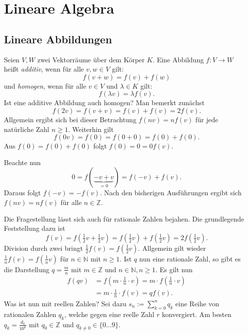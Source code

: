 \documentclass[a4paper,10pt,fleqn,twocolumn,twoside,dvipdfmx]{scrartcl}
\numberwithin{equation}{section}
\newcommand{\N}{\mathbb N}
\newcommand{\Z}{\mathbb Z}
\theoremstyle{rmbox}
\begin{document}
\section{Lineare Algebra}
\subsection{Lineare Abbildungen}
Seien $V,W$ zwei Vektorräume über dem Körper $K$. Eine Abbildung
$f\colon V\to W$ heißt \emph{additiv}, wenn für alle $v,w\in V$ gilt:%
\begin{equation}
f(v+w) = f(v)+f(w)
\end{equation}
und \emph{homogen}, wenn für alle $v\in V$ und $\lambda\in K$ gilt:
\begin{equation}
f(\lambda v) = \lambda f(v).
\end{equation}
Ist eine additive Abbildung auch homogen? Man bemerkt zunächst%
\begin{equation}
f(2v) = f(v+v) = f(v)+f(v) = 2f(v).
\end{equation}
Allgemein ergibt sich bei dieser Betrachtung $f(nv) = nf(v)$ für jede
natürliche Zahl $n\ge 1$. Weiterhin gilt%
\begin{equation}
f(0v) = f(0) = f(0+0) = f(0) + f(0).
\end{equation}
Aus $f(0)=f(0)+f(0)$ folgt $f(0)=0=0f(v)$.

Beachte nun
\begin{equation}
0 = f(\underbrace{-v+v}_{=0}) = f(-v)+f(v).
\end{equation}
Daraus folgt $f(-v) = -f(v)$.
Nach den bisherigen Ausführungen ergibt sich $f(nv) = nf(v)$ für alle
$n\in\Z$.

Die Fragestellung lässt sich auch für rationale Zahlen bejahen.
Die grundlegende Feststellung dazu ist
\begin{equation}
f(v) = f(\tfrac{1}{2}v+\tfrac{1}{2}v) = f(\tfrac{1}{2}v) + f(\tfrac{1}{2}v)
= 2f(\tfrac{1}{2}v).
\end{equation}
Division durch zwei bringt $\tfrac{1}{2}f(v) = f(\tfrac{1}{2}v)$.
Allgemein gilt wieder $\frac{1}{n}f(v) = f(\tfrac{1}{n}v)$ für
$n\in\N$ mit $n\ge 1$. Ist $q$ nun eine rationale Zahl, so gibt
es die Darstellung $q=\frac{m}{n}$ mit $m\in\Z$ und $n\in\N, n\ge 1$.
Es gilt nun
\begin{equation}
\begin{split}
f(qv) &= f(m\cdot\tfrac{1}{n}\cdot v) = m\cdot f(\tfrac{1}{n}\cdot v)\\
&= m\cdot\tfrac{1}{n}\cdot f(v) = qf(v).
\end{split}
\end{equation}
Was ist nun mit reellen Zahlen? Sei dazu $s_n:=\sum_{k=0}^n q_k$
eine Reihe von rationalen Zahlen $q_k$, welche gegen eine reelle
Zahl $r$ konvergiert. Am besten $q_k = \frac{d_k}{10^k}$ mit
$q_0\in\Z$ und $q_{k\ne 0}\in\{0\ldots 9\}$.
\end{document}
